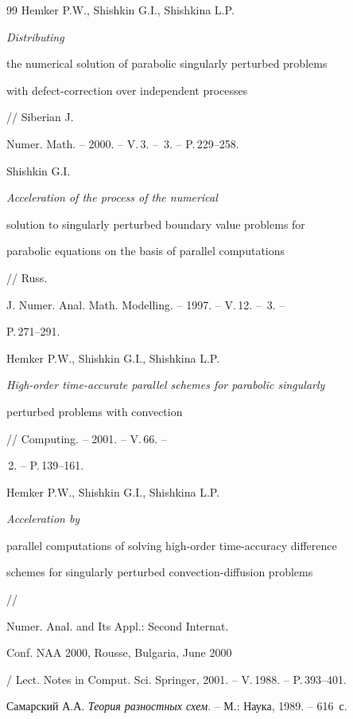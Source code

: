 \begin{thebibliography}{99}
Hemker P.W., Shishkin G.I., Shishkina L.P. {\em Distributing


the numerical solution of parabolic singularly perturbed problems


with defect-correction over independent processes} // Siberian J.


Numer. Math. -- 2000. -- V.\,3. -- \No\,3. -- P.\,229--258.




Shishkin G.I. {\em Acceleration of the process of the numerical


solution to singularly perturbed boundary value problems for


parabolic equations on the basis of parallel computations} // Russ.


J. Numer. Anal. Math. Modelling. -- 1997. -- V.\,12. -- \No\,3. --


P.\,271--291.




Hemker P.W., Shishkin G.I., Shishkina L.P.


{\em High-order time-accurate parallel schemes for parabolic singularly


perturbed problems with convection} // Computing. -- 2001. -- V.\,66. --


\No\,2. -- P.\,139--161. 




Hemker P.W., Shishkin G.I., Shishkina L.P. {\em Acceleration by


parallel computations of solving high-order time-accuracy difference


schemes for singularly perturbed convection-diffusion problems} //


Numer. Anal. and Its Appl.: Second Internat.


Conf. NAA 2000, Rousse, Bulgaria, June 2000




/ Lect. Notes in Comput. Sci. Springer, 2001. -- V.\,1988. -- P.\,393--401.




Самарский А.А. {\em Теория разностных схем}. -- М.: Наука, 1989. -- 616~с.





\end{thebibliography}





\vskip 2cm














\label{end}














